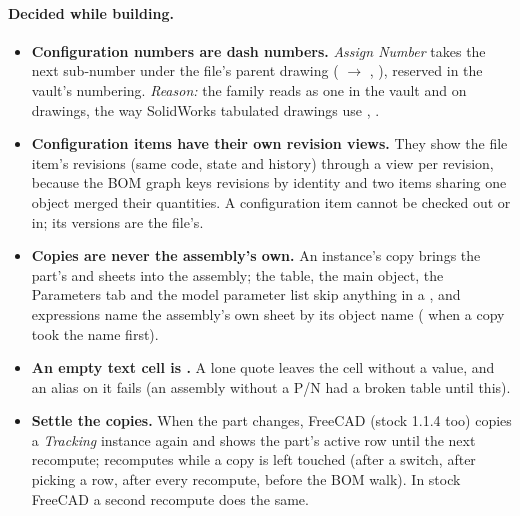 \paragraph{Decided while building.}
\begin{itemize}
  \item \textbf{Configuration numbers are dash numbers.} \emph{Assign Number} takes the next sub-number under
        the file's parent drawing ( $\rightarrow$ , ), reserved in
        the vault's numbering. \emph{Reason:} the family reads as one in the vault and on drawings, the way
        SolidWorks tabulated drawings use , .
  \item \textbf{Configuration items have their own revision views.} They show the file item's revisions
        (same code, state and history) through a view per revision, because the BOM graph keys revisions by
        identity and two items sharing one object merged their quantities. A configuration item cannot be
        checked out or in; its versions are the file's.
  \item \textbf{Copies are never the assembly's own.} An instance's copy brings the part's
         and  sheets into the assembly; the table, the main object,
        the Parameters tab and the model parameter list skip anything in a , and
        expressions name the assembly's own sheet by its object name ( when a copy
        took the name first).
  \item \textbf{An empty text cell is \code{=<<>>}.} A lone quote leaves the cell without a value, and an
        alias on it fails (an assembly without a P/N had a broken table until this).
  \item \textbf{Settle the copies.} When the part changes, FreeCAD (stock 1.1.4 too) copies a
        \emph{Tracking} instance again and shows the part's active row until the next recompute;
         recomputes while a copy is left touched (after a switch, after picking a row,
        after every recompute, before the BOM walk). In stock FreeCAD a second recompute does the same.
\end{itemize}

